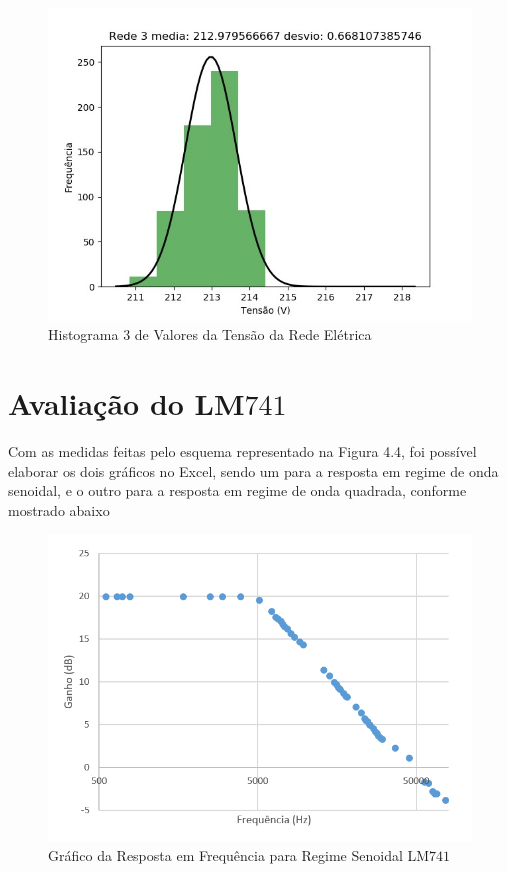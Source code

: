 \documentclass[14pt, oneside]{book}
\newcommand\tab[1][1cm]{\hspace*{#1}}
\theoremstyle{definition}
\begin{document}
                \begin{figure}[H]
                        \centering
                        \includegraphics[scale = 0.6]{33.jpeg}
                        \caption{Histograma $3$ de Valores da Tensão da Rede Elétrica}
                        \label{33}
                    \end{figure}
            
          
            
            
            
            \section{Avaliação do LM$741$}
                \tab Com as medidas feitas pelo esquema representado na Figura 4.4, foi possível elaborar os dois gráficos no Excel, sendo um para a resposta em regime de onda senoidal, e o outro para a resposta em regime de onda quadrada, conforme mostrado abaixo
                
                \begin{figure}[H]
                        \centering
                        \includegraphics[scale = 1]{amplificacao_senoidal(db).PNG}
                        \caption{Gráfico da Resposta em Frequência para Regime Senoidal LM$741$}
                        \label{senoidal}
                    \end{figure}
                    
\end{document}
